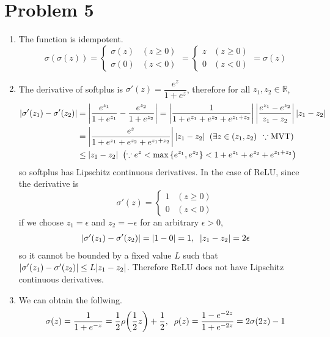 \documentclass[10pt]{article}
\begin{document}
\section*{Problem 5}
\begin{enumerate}[leftmargin=*, label=(\alph*)]
    \item The function is idempotent.
    $$\sigma(\sigma(z)) = \begin{cases}
        \sigma(z) & (z \geq 0) \\ \sigma(0) & (z < 0)
    \end{cases} = \begin{cases}
        z & (z \geq 0) \\ 0 & (z < 0)
    \end{cases} = \sigma(z)$$
    \item The derivative of softplus is $\sigma'(z) = \dfrac{e^z}{1 + e^z}$, therefore for all $z_1, z_2 \in \mathbb{R}$,
    \begin{align*}
        \left|\sigma'(z_1) - \sigma'(z_2)\right| &= \left|\frac{e^{z_1}}{1 + e^{z_1}} - \frac{e^{z_2}}{1 + e^{z_2}}\right| = \left|\frac{1}{1 + e^{z_1} + e^{z_2} + e^{z_1 + z_2}}\right|\left|\frac{e^{z_1} - e^{z_2}}{z_1 - z_2}\right|\left| z_1 - z_2 \right| \\
        &= \left|\frac{e^z}{1 + e^{z_1} + e^{z_2} + e^{z_1 + z_2}}\right|\qty|z_1 - z_2| \;\; \qty(\exists z \in \qty(z_1, z_2) \,\; \because \text{MVT}) \\
        &\leq \qty|z_1 - z_2| \;\; \qty(\because e^z < \max\qty{e^{z_1}, e^{z_2}} < 1 + e^{z_1} + e^{z_2} + e^{z_1 + z_2})
    \end{align*}
    so softplus has Lipschitz continuous derivatives. In the case of ReLU, since the derivative is 
    $$\sigma'(z) = \begin{cases}
        1 & (z \geq 0) \\ 0 & (z < 0)
    \end{cases}$$
    if we choose $z_1 = \epsilon$ and $z_2 = -\epsilon$ for an arbitrary $\epsilon > 0$,
    \begin{align*}
        \left|\sigma'(z_1) - \sigma'(z_2)\right| = \qty|1 - 0| = 1, \;\; \qty|z_1 - z_2| = 2\epsilon
    \end{align*}
    so it cannot be bounded by a fixed value $L$ such that $\qty|\sigma'(z_1) - \sigma'(z_2)| \leq L\qty|z_1 - z_2|$. Therefore ReLU does not have Lipschitz continuous derivatives.
    \item We can obtain the follwing.
    $$\sigma(z) = \frac{1}{1 + e^{-z}} = \frac{1}{2}\rho\qty(\frac{1}{2}z) + \frac{1}{2}, \;\; \rho(z) = \frac{1 - e^{-2z}}{1 + e^{-2z}} = 2\sigma(2z) - 1$$

\end{enumerate}
\end{document}
